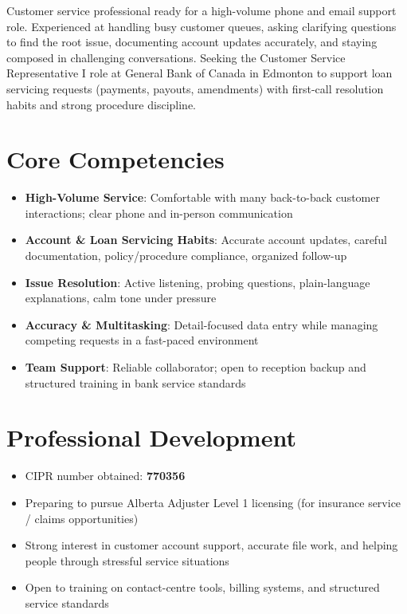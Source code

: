 \documentclass[11pt,a4paper,sans]{moderncv}
\begin{document}
\makecvtitle

\vspace{6pt}
\small{Customer service professional ready for a high-volume phone and email support role. Experienced at handling busy customer queues, asking clarifying questions to find the root issue, documenting account updates accurately, and staying composed in challenging conversations. Seeking the Customer Service Representative I role at General Bank of Canada in Edmonton to support loan servicing requests (payments, payouts, amendments) with first-call resolution habits and strong procedure discipline.}

\section{Core Competencies}
\vspace{1pt}
\begin{itemize}
\item \textbf{High-Volume Service}: Comfortable with many back-to-back customer interactions; clear phone and in-person communication
\item \textbf{Account \& Loan Servicing Habits}: Accurate account updates, careful documentation, policy/procedure compliance, organized follow-up
\item \textbf{Issue Resolution}: Active listening, probing questions, plain-language explanations, calm tone under pressure
\item \textbf{Accuracy \& Multitasking}: Detail-focused data entry while managing competing requests in a fast-paced environment
\item \textbf{Team Support}: Reliable collaborator; open to reception backup and structured training in bank service standards
\end{itemize}

\section{Professional Development}
\vspace{1pt}
\begin{itemize}
\item CIPR number obtained: \textbf{770356}
\item Preparing to pursue Alberta Adjuster Level 1 licensing (for insurance service / claims opportunities)
\item Strong interest in customer account support, accurate file work, and helping people through stressful service situations
\item Open to training on contact-centre tools, billing systems, and structured service standards
\end{itemize}
\end{document}
